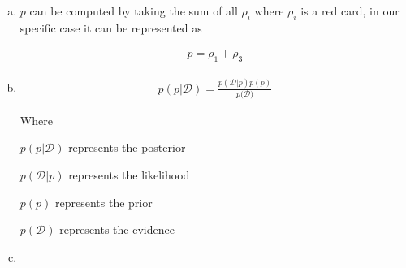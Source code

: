 \documentclass[12pt,letterpaper]{article}
\begin{document}
\begin{enumerate}[(a)]
    \item 
        $p$ can be computed by taking the sum of all $\rho_i$ where $\rho_i$ is a red card, in our specific case it can be represented as
        
        \begin{align*}
            p = \rho_1 + \rho_3
        \end{align*}
    
    \item 
        \begin{align*}
            p(p | \mathcal{D}) = \frac{p(\mathcal{D}|p)p(p)}{p(\mathcal{D)}}
        \end{align*}
        
        Where 
        
        $p(p|\mathcal{D})$ represents the posterior
        
        $p(\mathcal{D}|p)$ represents the likelihood

        $p(p)$ represents the prior
        
        $p(\mathcal{D})$ represents the evidence
        
        
    \item
                
        
\end{enumerate}
\end{document}
